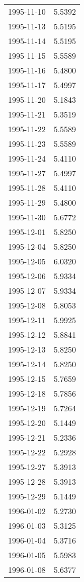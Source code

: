 \begin{tabular}{lr}
1995-11-10 &      5.5392 \\
1995-11-13 &      5.5195 \\
1995-11-14 &      5.5195 \\
1995-11-15 &      5.5589 \\
1995-11-16 &      5.4800 \\
1995-11-17 &      5.4997 \\
1995-11-20 &      5.1843 \\
1995-11-21 &      5.3519 \\
1995-11-22 &      5.5589 \\
1995-11-23 &      5.5589 \\
1995-11-24 &      5.4110 \\
1995-11-27 &      5.4997 \\
1995-11-28 &      5.4110 \\
1995-11-29 &      5.4800 \\
1995-11-30 &      5.6772 \\
1995-12-01 &      5.8250 \\
1995-12-04 &      5.8250 \\
1995-12-05 &      6.0320 \\
1995-12-06 &      5.9334 \\
1995-12-07 &      5.9334 \\
1995-12-08 &      5.8053 \\
1995-12-11 &      5.9925 \\
1995-12-12 &      5.8841 \\
1995-12-13 &      5.8250 \\
1995-12-14 &      5.8250 \\
1995-12-15 &      5.7659 \\
1995-12-18 &      5.7856 \\
1995-12-19 &      5.7264 \\
1995-12-20 &      5.1449 \\
1995-12-21 &      5.2336 \\
1995-12-22 &      5.2928 \\
1995-12-27 &      5.3913 \\
1995-12-28 &      5.3913 \\
1995-12-29 &      5.1449 \\
1996-01-02 &      5.2730 \\
1996-01-03 &      5.3125 \\
1996-01-04 &      5.3716 \\
1996-01-05 &      5.5983 \\
1996-01-08 &      5.6377 \\

\end{tabular}
